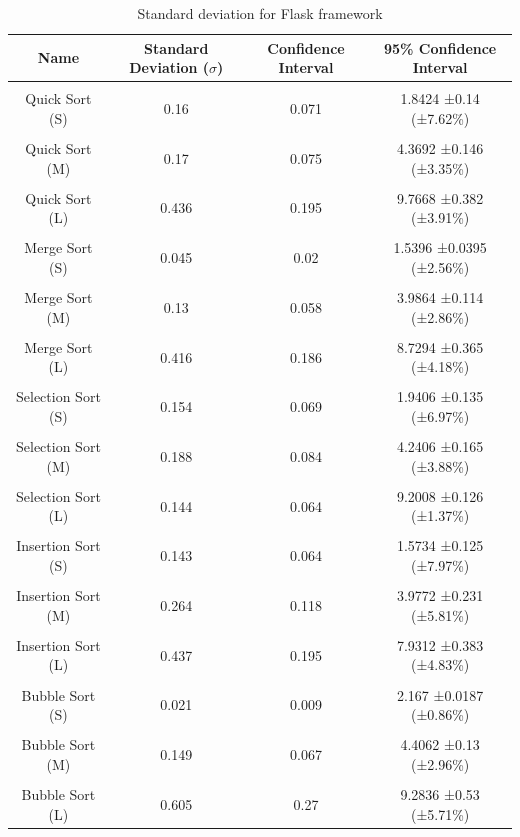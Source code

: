 \bigskip
\begin{table}[h!]
\centering
\begin{tabular}{||c c c c||} 
\hline
Name & Standard Deviation ($\sigma$) & Confidence Interval & 95\% Confidence Interval \\ [1ex] 
\hline\hline
 & & & \\
Quick Sort (S) & 0.16 & 0.071 & 1.8424 ±0.14 (±7.62\%) \\
 & & & \\
Quick Sort (M) & 0.17 & 0.075 & 4.3692 ±0.146 (±3.35\%) \\
 & & & \\
Quick Sort (L) & 0.436 & 0.195 & 9.7668 ±0.382 (±3.91\%) \\
 & & & \\
Merge Sort (S) & 0.045 & 0.02 & 1.5396 ±0.0395 (±2.56\%) \\
 & & & \\
Merge Sort (M) & 0.13 & 0.058 & 3.9864 ±0.114 (±2.86\%) \\
 & & & \\
Merge Sort (L) & 0.416 & 0.186 & 8.7294 ±0.365 (±4.18\%) \\
 & & & \\
Selection Sort (S) & 0.154 & 0.069 & 1.9406 ±0.135 (±6.97\%) \\
 & & & \\
Selection Sort (M) & 0.188 & 0.084 & 4.2406 ±0.165 (±3.88\%) \\
 & & & \\
Selection Sort (L) & 0.144 & 0.064 & 9.2008 ±0.126 (±1.37\%) \\
 & & & \\
Insertion Sort (S) & 0.143 & 0.064 & 1.5734 ±0.125 (±7.97\%) \\
 & & & \\
Insertion Sort (M) & 0.264 & 0.118 & 3.9772 ±0.231 (±5.81\%) \\
 & & & \\
Insertion Sort (L) & 0.437 & 0.195 & 7.9312 ±0.383 (±4.83\%) \\
 & & & \\
Bubble Sort (S) & 0.021 & 0.009 & 2.167 ±0.0187 (±0.86\%) \\
 & & & \\
Bubble Sort (M) & 0.149 & 0.067 & 4.4062 ±0.13 (±2.96\%) \\
 & & & \\
Bubble Sort (L) & 0.605 & 0.27 & 9.2836 ±0.53 (±5.71\%) \\ [1ex]
\hline
\end{tabular}
\caption{Standard deviation for Flask framework}
\label{table:time_complexity_2}
\end{table}
\bigskip

